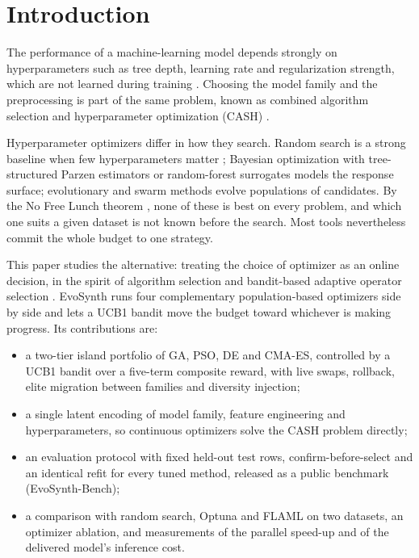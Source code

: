 \documentclass[conference]{IEEEtran}
\begin{document}
\section{Introduction}
The performance of a machine-learning model depends strongly on hyperparameters such as tree depth, learning rate and regularization strength, which are not learned during training \cite{feurer2019hyperparameter, bischl2023hyperparameter, franceschi2025hyperparameter}. Choosing the model family and the preprocessing is part of the same problem, known as combined algorithm selection and hyperparameter optimization (CASH) \cite{thornton2013autoweka}.

Hyperparameter optimizers differ in how they search. Random search is a strong baseline when few hyperparameters matter \cite{bergstra2012random}; Bayesian optimization with tree-structured Parzen estimators \cite{bergstra2011algorithms} or random-forest surrogates \cite{hutter2011sequential} models the response surface; evolutionary and swarm methods \cite{holland1975adaptation, kennedy1995particle, storn1997differential, hansen2001completely} evolve populations of candidates. By the No Free Lunch theorem \cite{wolpert1997no}, none of these is best on every problem, and which one suits a given dataset is not known before the search. Most tools nevertheless commit the whole budget to one strategy.

This paper studies the alternative: treating the choice of optimizer as an online decision, in the spirit of algorithm selection \cite{rice1976algorithm, kerschke2019automated} and bandit-based adaptive operator selection \cite{fialho2010analyzing}. EvoSynth runs four complementary population-based optimizers side by side and lets a UCB1 bandit \cite{auer2002finite} move the budget toward whichever is making progress. Its contributions are:
\begin{itemize}
    \item a two-tier island portfolio of GA, PSO, DE and CMA-ES, controlled by a UCB1 bandit over a five-term composite reward, with live swaps, rollback, elite migration between families and diversity injection;
    \item a single latent encoding of model family, feature engineering and hyperparameters, so continuous optimizers solve the CASH problem directly;
    \item an evaluation protocol with fixed held-out test rows, confirm-before-select and an identical refit for every tuned method, released as a public benchmark (EvoSynth-Bench);
    \item a comparison with random search, Optuna and FLAML on two datasets, an optimizer ablation, and measurements of the parallel speed-up and of the delivered model's inference cost.
\end{itemize}
\end{document}
